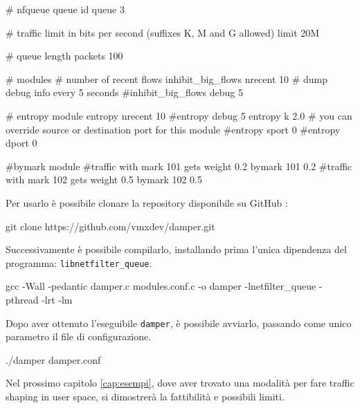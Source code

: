 \begin{damper}
# nfqueue queue id
queue 3

# traffic limit in bits per second (suffixes K, M and G allowed)
limit 20M

# queue length
packets 100

# modules
# number of recent flows
inhibit_big_flows nrecent 10
# dump debug info every 5 seconds
#inhibit_big_flows debug 5

# entropy module
entropy nrecent 10
#entropy debug 5
entropy k 2.0
# you can override source or destination port for this module
#entropy sport 0
#entropy dport 0

#bymark module
#traffic with mark 101 gets weight 0.2
bymark 101 0.2
#traffic with mark 102 gets weight 0.5
bymark 102 0.5

\end{damper}
Per usarlo è possibile clonare la repository disponibile su GitHub \cite{damper}:
\begin{bash}[Clonazione]
git clone https://github.com/vmxdev/damper.git
\end{bash}
Successivamente è possibile compilarlo, installando prima l'unica dipendenza del programma: \texttt{libnetfilter\_queue}.
\begin{bash}[Compilazione]
gcc -Wall -pedantic damper.c modules.conf.c -o damper -lnetfilter_queue -pthread -lrt -lm
\end{bash}
Dopo aver ottenuto l'eseguibile \texttt{damper}, è possibile avviarlo, passando come unico parametro il file di configurazione.
\begin{bash}[Esecuzione]
./damper damper.conf
\end{bash}
Nel prossimo capitolo \ref{cap:esempi}, dove aver trovato una modalità per fare traffic shaping in user space, si dimostrerà la fattibilità e possibili limiti.
